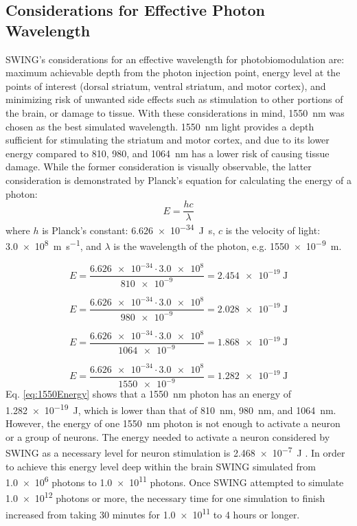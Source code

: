 \documentclass[journal,twoside,web]{ieeecolor}
\begin{document}
\subsection{Considerations for Effective Photon Wavelength}
SWING's considerations for an effective wavelength for photobiomodulation are: maximum achievable depth from the photon injection point, energy level at the points of interest 
(dorsal striatum, ventral striatum, and motor cortex), and minimizing risk of unwanted side effects such as stimulation to other portions 
of the brain, or damage to tissue. With these considerations in mind, 1550~nm was chosen as the best simulated wavelength. 1550~nm light 
provides a depth sufficient for stimulating the striatum and motor cortex, and due to its lower energy compared to 810, 980, and 1064~nm has a 
lower risk of causing tissue damage. While the former consideration is visually observable, the latter consideration is demonstrated by 
Planck's equation for calculating the energy of a photon:
\begin{equation}
    \label{eq:PhotonEnergy}
    E = \frac{hc}{\lambda}
\end{equation}
where $h$ is Planck's constant: \SI{6.626e-34}{\joule\second}, $c$ is the velocity of light: \SI{3.0e8}{\meter\per\second}, and $\lambda$ is 
the wavelength of the photon, e.g. \SI{1550e-9}{\meter}. 

\begin{equation}
    \label{eq:810Energy}
    E = \frac{\num{6.626e-34}\cdot\num{3.0e8}}{\num{810e-9}} = \SI{2.454e-19}{\joule}
\end{equation}

\begin{equation}
    \label{eq:980Energy}
    E = \frac{\num{6.626e-34}\cdot\num{3.0e8}}{\num{980e-9}} = \SI{2.028e-19}{\joule}
\end{equation}

\begin{equation}
    \label{eq:1064Energy}
    E = \frac{\num{6.626e-34}\cdot\num{3.0e8}}{\num{1064e-9}} = \SI{1.868e-19}{\joule}
\end{equation}

\begin{equation}
    \label{eq:1550Energy}
    E = \frac{\num{6.626e-34}\cdot\num{3.0e8}}{\num{1550e-9}} = \SI{1.282e-19}{\joule}
\end{equation}
Eq. \eqref{eq:1550Energy} shows that a 1550~nm photon has an energy of \SI{1.282e-19}{\joule}, which is lower than that of 810~nm, 980~nm, and 1064~nm. However, 
the energy of one 1550~nm photon is not enough to activate a neuron or a group of neurons. The energy needed to activate a neuron considered by SWING as a 
necessary level for neuron stimulation is \SI{2.468e-7}{\joule} \cite{b8}. In order to achieve this energy level deep within the brain SWING simulated from 
\num{1.0e6} photons to \num{1.0e11} photons. Once SWING attempted to simulate \num{1.0e12} photons or more, the necessary time for one simulation to finish 
increased from taking 30 minutes for \num{1.0e11} to 4 hours or longer.
\end{document}
